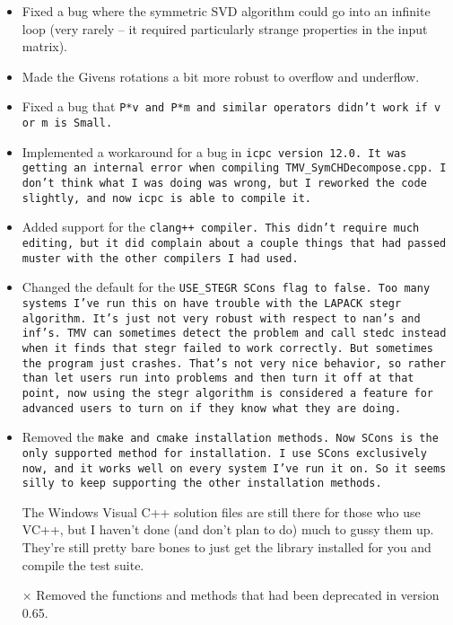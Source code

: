 \begin{itemize}
\item
Fixed a bug where the symmetric SVD algorithm could go into an infinite loop (very rarely -- it required particularly strange properties in the input matrix).
 
\item
Made the Givens rotations a bit more robust to overflow and underflow.

\item
Fixed a bug that \tt{P*v} and \tt{P*m} and similar operators didn't work if 
\tt{v} or \tt{m} is \tt{Small}.

\item
Implemented a workaround for a bug in \tt{icpc} version 12.0.
It was getting an internal
error when compiling \tt{TMV\_SymCHDecompose.cpp}.  I don't think what I was 
doing was wrong, but I reworked the code slightly, and now \tt{icpc} is able
to compile it.

\item 
Added support for the \tt{clang++} compiler.  This didn't require much editing, but it did complain about a couple things that had passed muster with the other compilers I had used.

\item
Changed the default for the \tt{USE\_STEGR} SCons flag to \tt{false}.  Too many
systems I've run this on have trouble with the LAPACK \tt{stegr} algorithm.
It's just not very robust with respect to \tt{nan}'s and \tt{inf}'s.  TMV can
sometimes detect the problem and call \tt{stedc} instead when it finds 
that \tt{stegr} failed to work correctly.  But sometimes the program just
crashes.  That's not very nice behavior, so rather than let users run 
into problems and then turn it off at that point, now
using the \tt{stegr} algorithm is considered a feature for advanced users to turn on if 
they know what they are doing.

\item
Removed the \tt{make} and \tt{cmake} installation methods.  
Now SCons is the 
only supported method for installation.  I use SCons exclusively now, 
and it works well on every system I've run it on.  So it seems silly
to keep supporting the other installation methods.  

The Windows Visual C++ solution files are still there for those who use VC++,
but I haven't done (and don't plan to do) much to gussy them up.  They're
still pretty bare bones to just get the library installed for you and
compile the test suite.

\item[$\times$]
Removed the functions and methods that had been deprecated in version 0.65.


\end{itemize}
